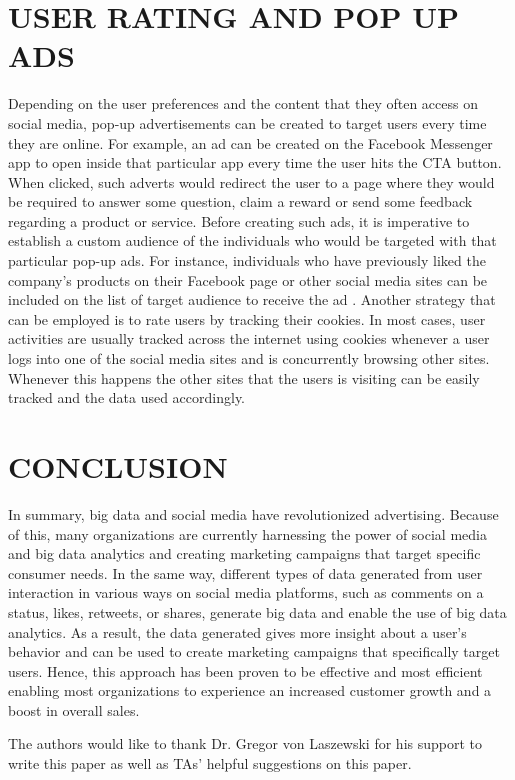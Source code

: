 \documentclass[sigconf]{acmart}
\begin{document}
\section{USER RATING AND POP UP ADS}
Depending on the user preferences and the content that they often access on social media, pop-up advertisements can be created to target users every time they are online. For example, an ad can be created on the Facebook Messenger app to open inside that particular app every time the user hits the CTA button. When clicked, such adverts would redirect the user to a page where they would be required to answer some question, claim a reward or send some feedback regarding a product or service. Before creating such ads, it is imperative to establish a custom audience of the individuals who would be targeted with that particular pop-up ads. For instance, individuals who have previously liked the company’s products on their Facebook page or other social media sites can be included on the list of target audience to receive the ad \cite{Aycock2010}. Another strategy that can be employed is to rate users by tracking their cookies. In most cases, user activities are usually tracked across the internet using cookies whenever a user logs into one of the social media sites and is concurrently browsing other sites. Whenever this happens the other sites that the users is visiting can be easily tracked and the data used accordingly.

\section{CONCLUSION}
In summary, big data and social media have revolutionized advertising. Because of this, many organizations are currently harnessing the power of social media and big data analytics and creating marketing campaigns that target specific consumer needs. In the same way, different types of data generated from user interaction in various ways on social media platforms, such as comments on a status, likes, retweets, or shares, generate big data and enable the use of big data analytics. As a result, the data generated gives more insight about a user’s behavior and can be used to create marketing campaigns that specifically target users. Hence, this approach has been proven to be effective and most efficient enabling most organizations to experience an increased customer growth and a boost in overall sales.

\begin{acks}

The authors would like to thank Dr. Gregor von Laszewski for his support to write this paper as well as TAs' helpful suggestions on this paper. 

\end{acks}


 
\end{document}
